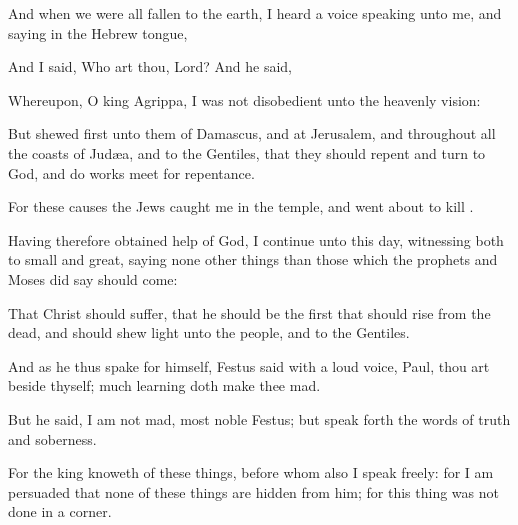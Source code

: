 {And when
we were
all
fallen
to the
earth, I
heard a
voice
speaking
unto
me,
and
saying in the
Hebrew
tongue,
{}

And
I
said,
Who art
thou,
Lord?
And he
said,
{}




Whereupon, O
king
Agrippa, I
was
not
disobedient unto the
heavenly
vision:

But
shewed
first unto
them
of
Damascus,
and at
Jerusalem,
and
throughout
all the
coasts of
Judæa,
and
{} to the
Gentiles, that they should
repent
and
turn
to
God, and
do
works
meet for
repentance.

For these
causes the
Jews
caught
me
in the
temple, and went
about to
kill
{}.

Having
therefore
obtained
help
of
God, I
continue
unto
this
day,
witnessing
both to
small
and
great,
saying
none other
things
than those
which the
prophets
and
Moses did
say
should
come:

That
Christ
should
suffer,
{}
that he should be the
first that should
rise
from the
dead, and should
shew
light unto the
people,
and to the
Gentiles.


\par }{\PP {}And as
he
thus spake for
himself,
Festus
said with a
loud
voice,
Paul, thou art beside
thyself;
much
learning doth
make
thee
mad.

But he
said, I
am
not
mad, most
noble
Festus;
but speak
forth the
words of
truth
and
soberness.

For the
king
knoweth
of these
things,
before
whom
also I
speak
freely:
for I am
persuaded that
none of these
things are hidden
from
him;
for this
thing
was
not
done
in a
corner.

}
